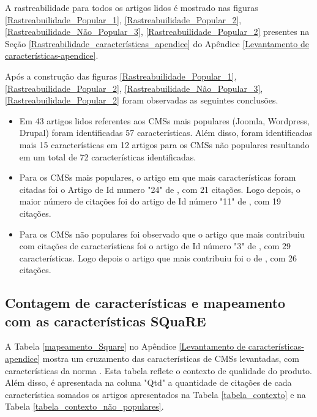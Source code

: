 A rastreabilidade para todos os artigos lidos é mostrado nas figuras \ref{Rastreabuilidade_Popular_1}, \ref{Rastreabuilidade_Popular_2}, \ref{Rastreabuilidade_Não_Popular_3}, \ref{Rastreabuilidade_Popular_2} presentes na Seção \ref{Rastreabilidade_características_apendice} do Apêndice \ref{Levantamento de características-apendice}.

Após a construção das figuras \ref{Rastreabuilidade_Popular_1}, \ref{Rastreabuilidade_Popular_2}, \ref{Rastreabuilidade_Não_Popular_3}, \ref{Rastreabuilidade_Popular_2} foram observadas as seguintes conclusões. 

\begin{itemize}
\item Em 43 artigos lidos referentes aos CMSs mais populares (Joomla, Wordpress, Drupal) foram identificadas 57 características. Além disso, foram identificadas mais 15 características em 12 artigos para os CMSs não populares resultando em um total de 72 características identificadas. 

\item Para os CMSs mais populares, o artigo em que mais características foram citadas foi o Artigo de Id numero "24" de , com 21 citações. Logo depois, o maior número de citações foi do artigo de Id número "11" de , com 19 citações.

\item Para os CMSs não populares foi observado que o artigo que mais contribuiu com citações de características foi o artigo de Id número "3" de , com 29 características. Logo depois o artigo que mais contribuiu foi o de , com 26 citações.
\end{itemize}



\subsection{Contagem de características e mapeamento com as características SQuaRE}

A Tabela \ref{mapeamento_Square} no Apêndice \ref{Levantamento de características-apendice} mostra um cruzamento das características de CMSs levantadas, com características da norma . Esta tabela reflete o contexto de qualidade do produto. Além disso, é apresentada na coluna "Qtd"  a quantidade de citações de cada característica somados os artigos apresentados na Tabela \ref{tabela_contexto} e na Tabela \ref{tabela_contexto_não_populares}.

